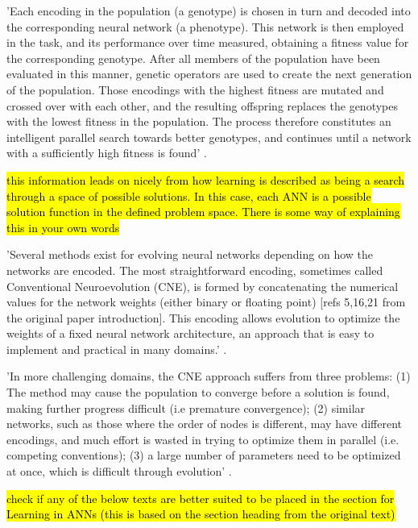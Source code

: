 'Each encoding in the population (a genotype) is chosen in turn and decoded into the corresponding neural network (a phenotype). This network is then employed in the task, and its performance over time measured, obtaining a fitness value for the corresponding genotype. After all members of the population have been evaluated in this manner, genetic operators are used to create the next generation of the population. Those encodings with the highest fitness are mutated and crossed over with each other, and the resulting offspring replaces the genotypes with the lowest fitness in the population. The process therefore constitutes an intelligent parallel search towards better genotypes, and continues until a network with a sufficiently high fitness is found' \cite{Miikkulainen2010}.

\hl{this information leads on nicely from how learning is described as being a search through a space of possible solutions. In this case, each ANN is a possible solution function in the defined problem space. There is some way of explaining this in your own words}


'Several methods exist for evolving neural networks depending on how the networks are encoded. The most straightforward encoding, sometimes called Conventional Neuroevolution (CNE), is formed by concatenating the numerical values for the network weights (either binary or floating point) [refs 5,16,21 from the original paper introduction]. This encoding allows evolution to optimize the weights of a fixed neural network architecture, an approach that is easy to implement and practical in many domains.' \cite{Miikkulainen2010}.

'In more challenging domains, the CNE approach suffers from three problems: (1) The method may cause the population to converge before a solution is found, making further progress difficult (i.e premature convergence); (2) similar networks, such as those where the order of nodes is different, may have different encodings, and much effort is wasted in trying to optimize them in parallel (i.e. competing conventions); (3) a large number of parameters need to be optimized at once, which is difficult through evolution' \cite{Miikkulainen2010}.

\hl{check if any of the below texts are better suited to be placed in the section for Learning in ANNs (this is based on the section heading from the original text)}

